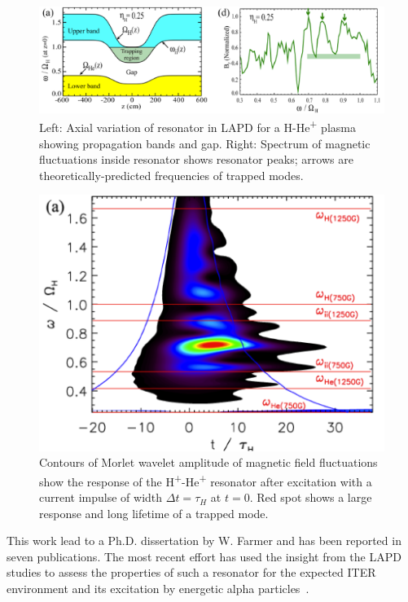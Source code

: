 \documentclass[11pt]{article}
\renewcommand{\cite}{\citep}
\begin{document}
\begin{figure}[!htbp]
\centerline{\includegraphics[width=5.0truein]{twoion1}}
\caption{Left: Axial variation of resonator in LAPD for a
H-He\textsuperscript{+} plasma showing propagation bands and gap. Right:
Spectrum of magnetic fluctuations inside resonator shows resonator
peaks; arrows are theoretically-predicted frequencies of trapped
modes.}\label{twoion1}
\end{figure}

\begin{figure}[!htbp]
\centerline{\includegraphics[width=4.4truein]{twoion2}}
\caption{Contours of Morlet wavelet amplitude of magnetic field
fluctuations show the response of the
H\textsuperscript{+}-He\textsuperscript{+} resonator after excitation
with a current impulse of width $\Delta t = \tau_H$ at
$t = 0$. Red spot shows a large response and long lifetime of a
trapped mode.}\label{twoion2}
\end{figure}

This work lead to a Ph.D. dissertation by W. Farmer and has been
reported in seven publications. The most recent effort has used the
insight from the LAPD studies to assess the properties of such a
resonator for the expected ITER environment and its excitation by
energetic alpha particles~\cite{farmer:2014}.
\end{document}
